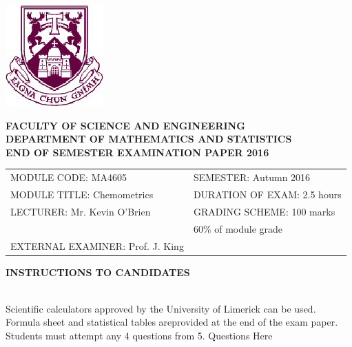 \documentclass[a4paper,12pt]{article}
\begin{document}
\begin{center}
\includegraphics[scale=0.65]{images/shieldtransparent2}
\end{center}

\begin{center}
\vspace{1cm}
\large \bf {FACULTY OF SCIENCE AND ENGINEERING} \\[0.5cm]
\normalsize DEPARTMENT OF MATHEMATICS AND STATISTICS \\[1.25cm]
\large \bf {END OF SEMESTER EXAMINATION PAPER 2016} \\[1.5cm]
\end{center}

\begin{tabular}{ll}
MODULE CODE: MA4605 & SEMESTER: Autumn 2016 \\[1cm]
MODULE TITLE: Chemometrics & DURATION OF EXAM: 2.5 hours \\[1cm]
LECTURER: Mr. Kevin O'Brien & GRADING SCHEME: 100 marks \\
& \phantom{GRADING SCHEME:} \footnotesize {60\% of module grade} \\[0.8cm]
EXTERNAL EXAMINER: Prof. J. King & \\
\end{tabular}
\bigskip
\begin{center}
{\bf INSTRUCTIONS TO CANDIDATES}
\end{center}

{\noindent \\ Scientific calculators approved by the University of Limerick can be used. \\
Formula sheet and statistical tables areprovided at the end of the exam paper.\\
Students must attempt any 4 questions from 5.}
\newpage
Questions Here
\newpage
\end{document}
